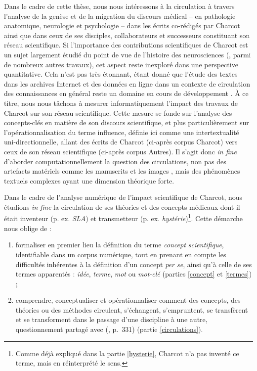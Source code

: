 Dans le cadre de cette thèse, nous nous intéressons à la circulation à travers l'analyse de la genèse et de la migration du discours médical -- en pathologie anatomique, neurologie et psychologie -- dans les écrits co-rédigés par Charcot ainsi que dans ceux de ses disciples, collaborateurs et successeurs constituant son \og{}réseau scientifique\fg{}. Si l'importance des contributions scientifiques de Charcot est un sujet largement étudié du point de vue de l'histoire des neurosciences (\citealp{bogousslavsky2011following,broussolle2012,camargo2024}, parmi de nombreux autres travaux), cet aspect reste inexploré dans une perspective quantitative. Cela n'est pas très étonnant, étant donné que l'étude des textes dans les archives Internet et des données en ligne dans un contexte de circulation des connaissances en général reste un domaine en cours de développement \citep{milia2023}. À ce titre, nous nous tâchons à mesurer informatiquement l'impact des travaux de Charcot sur son réseau scientifique. Cette mesure se fonde sur l'analyse des concepts-clés en matière de son discours scientifique, et plus particulièrement sur l'opérationnalisation du terme \og{}influence\fg{}, définie ici comme une intertextualité uni-directionnelle, allant des écrits de Charcot (ci-après corpus \og{}Charcot\fg{}) vers ceux de son réseau scientifique (ci-après corpus \og{}Autres\fg{}). Il s'agit donc \textit{in fine} d'aborder computationnellement la question des circulations, non pas des artefacts matériels comme les manuscrits \citep{gabay2021katabase} et les images \citep{joyeux2019visual}, mais des phénomènes textuels complexes \citep{manjavacas} ayant une dimension théorique forte. 

Dans le cadre de l'analyse numérique de l'impact scientifique de Charcot, nous étudions \textit{in fine} la circulation de ses théories et des concepts médicaux dont il était inventeur (p. ex. \textit{SLA}) et transmetteur (p. ex. \textit{hystérie})\footnote{Comme déjà expliqué dans la partie \ref{hysterie}, Charcot n'a pas inventé ce terme, mais en réinterprété le sens.}. Cette démarche nous oblige de :
\begin{enumerate}
	\item formaliser en premier lieu la définition du terme \textit{concept scientifique}, identifiable dans un corpus numérique, tout en prenant en compte les difficultés inhérentes à la définition d'un concept \textit{per se}, ainsi qu'à celle de ses termes apparentés : \textit{idée}, \textit{terme}, \textit{mot} ou \textit{mot-clé} (parties \ref{concept} et \ref{termes}) ;
	\item comprendre, conceptualiser et opérationnaliser \og{}comment des concepts, des théories ou des méthodes circulent, s'échangent, s'empruntent, se transfèrent et se transforment dans le passage d'une discipline à une autre\fg{}, questionnement partagé avec \citeauthor{landais2014frederic} (\citeyear{landais2014frederic}, p.~331) (partie \ref{circulations}).
\end{enumerate}

